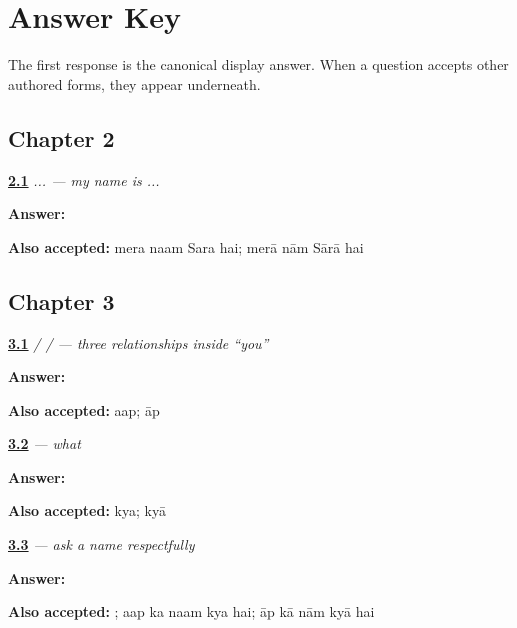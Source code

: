 \chapter*{Answer Key}

The first response is the canonical display answer. When a question accepts other authored forms, they appear underneath.

\section*{Chapter 2}

\noindent\begin{minipage}[t]{\linewidth}
\raggedright
\hyperlink{review-UR-C02-mera-naam-sara}{\textbf{2.1}} \emph{  ...  — my name is ...}\par
\small \textbf{Answer:}    \par
\footnotesize \textbf{Also accepted:} mera naam Sara hai; merā nām Sārā hai
\end{minipage}\par\medskip

\section*{Chapter 3}

\noindent\begin{minipage}[t]{\linewidth}
\raggedright
\hyperlink{review-UR-C03-aap-tum-tu-first-meeting}{\textbf{3.1}} \emph{ /  /  — three relationships inside “you”}\par
\small \textbf{Answer:} \par
\footnotesize \textbf{Also accepted:} aap; āp
\end{minipage}\par\medskip

\noindent\begin{minipage}[t]{\linewidth}
\raggedright
\hyperlink{review-UR-C03-kya-what}{\textbf{3.2}} \emph{ — what}\par
\small \textbf{Answer:} \par
\footnotesize \textbf{Also accepted:} kya; kyā
\end{minipage}\par\medskip

\noindent\begin{minipage}[t]{\linewidth}
\raggedright
\hyperlink{review-UR-C03-aap-ka-naam-kya-hai-question}{\textbf{3.3}} \emph{     — ask a name respectfully}\par
\small \textbf{Answer:}     \par
\footnotesize \textbf{Also accepted:}     ; aap ka naam kya hai; āp kā nām kyā hai
\end{minipage}\par\medskip

